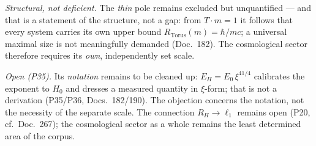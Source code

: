 \emph{Structural, not deficient.} The \emph{thin} pole remains excluded but unquantified --- and
that is a statement of the structure, not a gap: from $T\cdot m = 1$ it follows that every system
carries its own upper bound $R_\text{Torus}(m) = \hbar/mc$; a universal maximal size is not
meaningfully demanded (Doc.~182). The cosmological sector therefore requires its \emph{own},
independently set scale.

\emph{Open (P35).} Its \emph{notation} remains to be cleaned up: $E_H = E_0\,\xi^{41/4}$ calibrates
the exponent to $H_0$ and dresses a measured quantity in $\xi$-form; that is not a derivation
(P35/P36, Docs.~182/190). The objection concerns the notation, not the necessity of the separate
scale. The connection $R_H \to \ell_1$ remains open (P20, cf.\ Doc.~267); the cosmological
sector as a whole remains the least determined area of the corpus.

